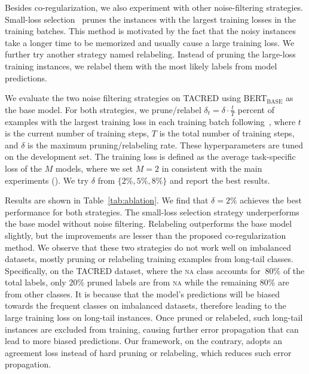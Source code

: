 \documentclass[11pt]{article}
\newcommand{\stitle}[1]{\vspace{0.3em}\noindent{\bf #1}}
\begin{document}
\stitle{Alternative strategies for noise filtering.}
Besides co-regularization, we also experiment with other noise-filtering strategies.
Small-loss selection~\cite{Jiang2018MentorNetLD,Han2018CoteachingRT,lee2019robust} prunes the instances with the largest training losses in the training batches.
This method is motivated by the fact that the noisy instances take a longer time to be memorized and usually cause a large training loss.
We further try another strategy named relabeling.
Instead of pruning the large-loss training instances, we relabel them with the most likely labels from model predictions.

We evaluate the two noise filtering strategies on TACRED using BERT$_\text{BASE}$ as the base model.
For both strategies, we prune/relabel $\delta_t=\delta \cdot \frac{t}{T}$ percent of examples with the largest training loss in each training batch following~\citet{Han2018CoteachingRT}, where $t$ is the current number of training steps, $T$ is the total number of training steps, and $\delta$ is the maximum pruning/relabeling rate.
These hyperparameters are tuned on the development set.
The training loss is defined as the average task-specific loss of the $M$ models, where we set $M=2$ in consistent with the main experiments ().
We try $\delta$ from $\{2\%, 5\%, 8\%\}$ and report the best results.

Results are shown in Table~\ref{tab:ablation}.
We find that $\delta=2\%$ achieves the best performance for both strategies.
The small-loss selection strategy underperforms the base model without noise filtering.
Relabeling outperforms the base model slightly, but the improvements are lesser than the proposed co-regularization method.
We observe that these two strategies do not work well on imbalanced datasets, mostly pruning or relabeling training examples from long-tail classes.
Specifically, on the TACRED dataset, where the \textsc{na} class accounts for $~80\%$ of the total labels, only $20\%$ pruned labels are from \textsc{na} while the remaining $80\%$ are from other classes.
It is because that the model's predictions will be biased towards the frequent classes on imbalanced datasets, therefore leading to the large training loss on long-tail instances.
Once pruned or relabeled, such long-tail instances are excluded from training, causing further error propagation that can lead to more biased predictions.
Our framework, on the contrary, adopts an agreement loss instead of hard pruning or relabeling, which reduces such error propagation.
\end{document}
